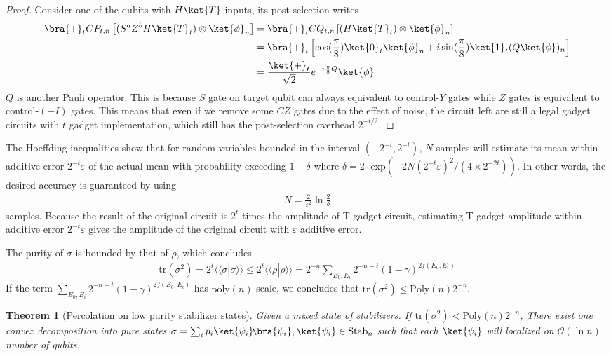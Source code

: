 \documentclass[aps,%
twocolumn,%
floatfix,%
pra,%
amsfonts,%
longbibliography,%
groupedaddress,%
superscriptaddress]{revtex4-2}%
\newtheorem{theorem}{Theorem}
\newcommand{\1}{\mathbbm{1}}
\begin{document}
\begin{proof}
    Consider one of the qubits with $H\ket{T}$ inputs, its post-selection writes 
    \begin{align}
       \bra{+}_t CP_{t,n}\left[(S^a Z^b H\ket{T}_t) \otimes \ket{\phi}_n\right] &=\bra{+}_t CQ_{t,n}\left[( H\ket{T}_t) \otimes \ket{\phi}_n\right]\\
       &=\bra{+}_t\left[\cos(\frac{\pi}{8}) \ket{0}_t \ket{\phi}_n+i\sin(\frac{\pi}{8}) \ket{1}_t (Q\ket{\phi})_n\right]\\
       &=\frac{\ket{+}_t}{\sqrt{2}} e^{-i\frac{\pi}{8}Q} \ket{\phi}
    \end{align}
    $Q$ is another Pauli operator. This is because $S$ gate on target qubit can always equivalent to control-$Y$ 
 gates while $Z$ gates is equivalent to control-$(-I)$ gates. This means that even if we remove some $CZ$ gates due to the effect of noise, the circuit left are still a legal gadget circuits with $t$ gadget implementation, which still has the post-selection overhead $2^{-t/2}$. 
\end{proof}
The Hoeffding inequalities show that for random variables bounded in the interval $(-2^{-t},2^{-t})$, $N$ samples will estimate its mean within additive error $2^{-t}\varepsilon$ of the actual mean with probability exceeding $1-\delta$ where $\delta = 2 \cdot \text{exp}{(-2N(2^{-t}\varepsilon)^2/(4 \times2^{-2t}))}$. In other  words, the desired accuracy is guaranteed by using 
\begin{align}
    N = \frac{2}{\varepsilon^2} \ln \frac{2}{\delta}
\end{align}
samples. Because the result of the original circuit is $2^t$ times the amplitude of T-gadget circuit, estimating T-gadget amplitude within additive error $2^{-t}\varepsilon$ gives the amplitude of the original circuit with $\varepsilon$ additive error. 

The purity of $\sigma $ is bounded by that of $\rho$, which concludes
\begin{align}
    \text{tr}(\sigma^2) =2^{t} \langle \!\langle \sigma|\sigma\rangle\!\rangle\leq 2^{t} \langle \!\langle \rho|\rho\rangle\!\rangle = 2^{-n}\sum_{E_0,E_i} 2^{-n-t}(1 - \gamma)^{2f(E_0,E_i)}
\end{align}
If the term $\sum_{E_0,E_i} 2^{-n-t}(1 - \gamma)^{2f(E_0,E_i)}$ has $\text{poly}(n)$ scale, we concludes that $\text{tr}(\sigma^2) \leq {\text{Poly}(n)}{2^{-n}}$. 

\begin{theorem}[Percolation on low purity stabilizer states]
    Given a mixed state of stabilizers. If $\text{tr}(\sigma^2) < {\text{Poly}(n)}{2^{-n}}$, There exist one convex decomposition into pure states $\sigma= \sum_i p_i \ket{\psi_i}\!\bra{\psi_i}, \ket{\psi_i} \in \text{Stab}_n$ such that each $ \ket{\psi_i}$ will localized on $\mathcal{O}(\ln n)$ number of qubits.    
\end{theorem}
\end{document}
